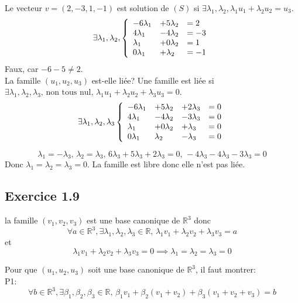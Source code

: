 \documentclass[]{book}
\theoremstyle{definition}
\newcommand{\bb}[1]{\mathbb{#1}}
\newcommand{\R}{\bb{R}}
\begin{document}
Le vecteur $v =(2,-3,1,-1)$ est solution de $(S)$ si $\exists \lambda_1, \lambda_2, \lambda_1 u_1 + \lambda_2 u_2 = u_3$.
$$
\exists \lambda_1, \lambda_2,
\left\{ 
\begin{array}{l l l}
  -6\lambda_1 & +5\lambda_2 & = 2 \\
  4\lambda_1  & -4\lambda_2 & = -3 \\
  \lambda_1   & +0\lambda_2 & = 1 \\
  0\lambda_1  & +\lambda_2   & = -1 \\
\end{array}
\right. 
$$
Faux, car $-6 -5 \neq 2$.\\


La famille $(u_1, u_2, u_3)$ est-elle li\'ee?
Une famille est li\'ee si $\exists \lambda_1, \lambda_2, \lambda_3,\, \text{non tous nul, } \lambda_1 u_1 + \lambda_2 u_2 + \lambda_3 u_3 = 0$.
$$
\exists \lambda_1, \lambda_2, \lambda_3
\left\{ 
\begin{array}{l l l l}
  -6\lambda_1 & +5\lambda_2 & +2\lambda_3 & = 0 \\
  4\lambda_1  & -4\lambda_2 & -3\lambda_3 & = 0 \\
  \lambda_1   & +0\lambda_2 & +\lambda_3 & = 0 \\
  0\lambda_1  & \lambda_2   & -\lambda_3 & = 0 \\
\end{array}
\right. 
$$

$$\lambda_1 = -\lambda_3,\, \lambda_2 = \lambda_3,\,6\lambda_3+5\lambda_3+2\lambda_3 = 0,\, -4\lambda_3 -4\lambda_3 -3\lambda_3 =0$$
Donc $\lambda_1=\lambda_2=\lambda_3=0$. La famille est libre donc elle n'est pas li\'ee. 



\subsection*{Exercice 1.9}
la famille $(v_1, v_2, v_3)$ est une base canonique de $\R^3$ donc
$$ \forall a \in \R^3, \exists \lambda_1,\lambda_2,\lambda_3 \in \R,\,
\lambda_1 v_{1} +\lambda_2 v_{2} +\lambda_3 v_{3} = a 
$$
et
$$
\lambda_1 v_{1} +\lambda_2 v_{2} +\lambda_3 v_{3} = 0
\implies
\lambda_1=\lambda_2=\lambda_3=0
$$

Pour que $(u_1, u_2, u_3)$ soit une base canonique de $\R^3$, il faut montrer:\\
P1:
$$ \forall b \in \R^3, \exists \beta_1,\beta_2,\beta_3 \in \R,\,
\beta_1 v_{1} + \beta_2 (v_{1} + v_{2}) +\beta_3 (v_{1} + v_{2} + v_{3}) = b 
$$
\end{document}
